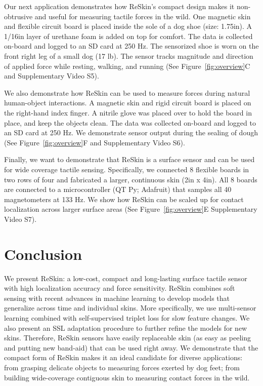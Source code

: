\documentclass{article}
\begin{document}
 Our next application demonstrates how ReSkin's compact design makes it non-obtrusive and useful for measuring tactile forces in the wild. One magnetic skin and flexible circuit board is placed inside the sole of a dog shoe (size: 1.75in). A 1/16in layer of urethane foam is added on top for comfort. The data is collected on-board and logged to an SD card at 250 Hz. The sensorized shoe is worn on the front right leg of a small dog (17 lb). The sensor tracks magnitude and direction of applied force while resting, walking, and running (See Figure~\ref{fig:overview}C and Supplementary Video S5).

 We also demonstrate how ReSkin can be used to measure forces during natural human-object interactions. A magnetic skin and rigid circuit board is placed on the right-hand index finger. A nitrile glove was placed over to hold the board in place, and keep the objects clean. The data was collected on-board and logged to an SD card at 250 Hz. We demonstrate sensor output during the sealing of dough (See Figure~\ref{fig:overview}F and Supplementary Video S6).

 Finally, we want to demonstrate that ReSkin is a surface sensor and can be used for wide coverage tactile sensing. Specifically, we connected 8 flexible boards in two rows of four and fabricated a larger, continuous skin (2in x 4in). All 8 boards are connected to a microcontroller (QT Py; Adafruit) that samples all 40 magnetometers at 133 Hz. We show how ReSkin can be scaled up for contact localization across larger surface areas (See Figure~\ref{fig:overview}E Supplementary Video S7).
\vspace{-0.1in}
\section{Conclusion}
We present ReSkin: a low-cost, compact and long-lasting surface tactile sensor with high localization accuracy and force sensitivity. ReSkin combines soft sensing with recent advances in machine learning to develop models that generalize across time and individual skins. More specifically, we use multi-sensor learning combined with self-supervised triplet loss for slow feature changes. We also present an SSL adaptation procedure to further refine the models for new skins. Therefore, ReSkin sensors have easily replaceable skin (as easy as peeling and putting new band-aid) that can be used right away. We demonstrate that the compact form of ReSkin makes it an ideal candidate for diverse applications: from grasping delicate objects to measuring forces exerted by dog feet; from building wide-coverage contiguous skin to measuring contact forces in the wild.  
\end{document}

